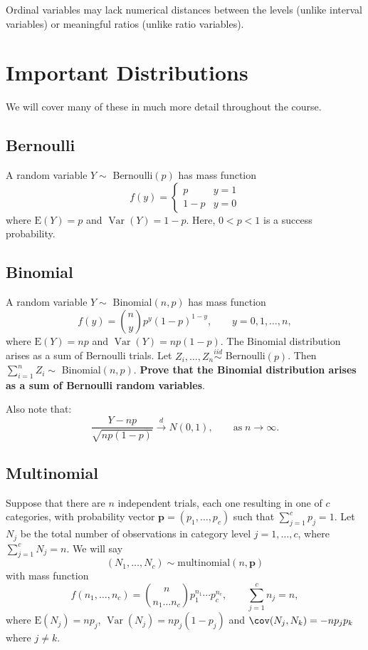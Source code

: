 \documentclass[12pt]{article}
\newcommand{\E}{\mathrm{E}}
\newcommand{\p}{\mathbf{p}}
\DeclareMathOperator{\E}{E}
\DeclareMathOperator{\Var}{Var}
\begin{document}
\noindent Ordinal variables may lack numerical distances between the levels (unlike interval variables) or meaningful ratios (unlike ratio variables).



\section*{Important Distributions}

We will cover many of these in much more detail throughout the course. 


\subsection*{Bernoulli}

A random variable $Y \sim$ Bernoulli$(p)$ has mass function
$$
  f(y) = \left\{\begin{array}{cc}
    p   & y = 1 \\
    1-p	& y = 0
  \end{array}\right.
$$
where $\E(Y) = p$ and $\Var(Y) = 1 - p$. Here, $0 < p < 1$ is a success probability. 


\subsection*{Binomial}

A random variable $Y \sim$ Binomial$(n,p)$ has mass function 
$$
  f(y) = {n \choose y}p^y(1-p)^{1-y}, \qquad y = 0,1,\ldots, n,
$$
where $\E(Y) = np$ and $\Var(Y) = np(1-p)$. The Binomial distribution arises as a sum of Bernoulli trials. Let $Z_i,\ldots, Z_n \overset{iid}{\sim}$ Bernoulli$(p)$. Then $\sum_{i=1}^nZ_i \sim$ Binomial$(n,p)$. \textbf{Prove that the Binomial distribution arises as a sum of Bernoulli random variables}. 

\vspace*{0.5cm}\noindent Also note that:
$$
  \frac{Y - np}{\sqrt{np(1-p)}} \overset{d}{\to} N(0,1), 
    \qquad \text{as} \; n \to \infty.
$$


\subsection*{Multinomial} 

Suppose that there are $n$ independent trials, each one resulting in one of $c$ categories, with probability vector $\p = (p_1,\ldots, p_c)$ such that $\sum_{j=1}^c p_j = 1$. Let $N_j$ be the total number of observations in category level $j = 1,\ldots,c$, where $\sum_{j=1}^c N_j = n$. We will say 
$$
  (N_1,\ldots,N_c) \sim \text{multinomial}(n,\p) 
$$
with mass function 
$$
  f(n_1,\ldots,n_c) = {n \choose n_1 \ldots n_c} p_1^{n_1}\cdots p_c^{n_c}, 
    \qquad \sum_{j=1}^c n_j = n,
$$
where $\E(N_j) = np_j$, $\Var(N_j) = np_j(1-p_j)$ and $\cov(N_j,N_k) = -np_jp_k$ where $j \neq k$.
\end{document}
